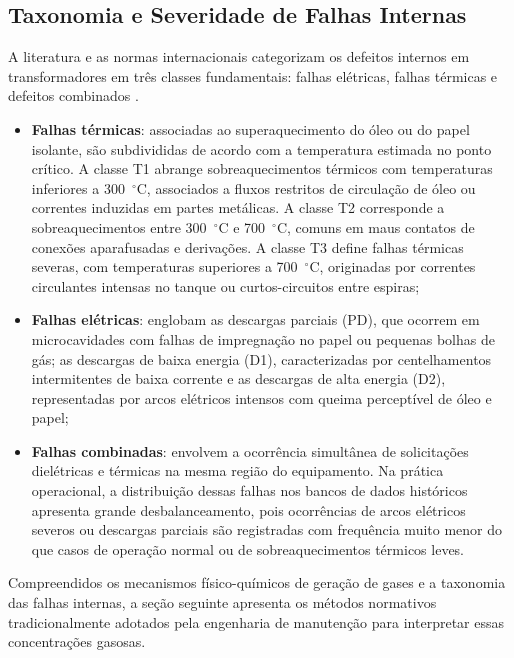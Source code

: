 \subsection{Taxonomia e Severidade de Falhas Internas}

A literatura e as normas internacionais categorizam os defeitos internos em transformadores em três classes fundamentais: falhas elétricas, falhas térmicas e defeitos combinados \cite{alsakini2025}. 

\begin{itemize}         
    \item \textbf{Falhas térmicas}: associadas ao superaquecimento do óleo ou do papel isolante, são subdivididas de acordo com a temperatura estimada no ponto crítico. A classe T1 abrange sobreaquecimentos térmicos com temperaturas inferiores a 300~$^\circ\text{C}$, associados a fluxos restritos de circulação de óleo ou correntes induzidas em partes metálicas. A classe T2 corresponde a sobreaquecimentos entre 300~$^\circ\text{C}$ e 700~$^\circ\text{C}$, comuns em maus contatos de conexões aparafusadas e derivações. A classe T3 define falhas térmicas severas, com temperaturas superiores a 700~$^\circ\text{C}$, originadas por correntes circulantes intensas no tanque ou curtos-circuitos entre espiras;
    \item \textbf{Falhas elétricas}: englobam as descargas parciais (PD), que ocorrem em microcavidades com falhas de impregnação no papel ou pequenas bolhas de gás; as descargas de baixa energia (D1), caracterizadas por centelhamentos intermitentes de baixa corrente e as descargas de alta energia (D2), representadas por arcos elétricos intensos com queima perceptível de óleo e papel;
    \item \textbf{Falhas combinadas}: envolvem a ocorrência simultânea de solicitações dielétricas e térmicas na mesma região do equipamento. Na prática operacional, a distribuição dessas falhas nos bancos de dados históricos apresenta grande desbalanceamento, pois ocorrências de arcos elétricos severos ou descargas parciais são registradas com frequência muito menor do que casos de operação normal ou de sobreaquecimentos térmicos leves.
\end{itemize}

Compreendidos os mecanismos físico-químicos de geração de gases e a taxonomia das falhas internas, a seção seguinte apresenta os métodos normativos tradicionalmente adotados pela engenharia de manutenção para interpretar essas concentrações gasosas.

